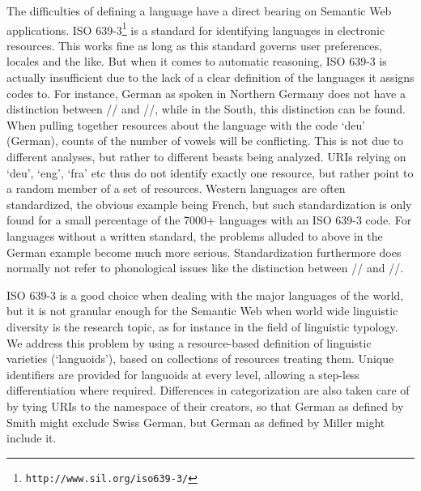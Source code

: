 \documentclass{llncs}
\begin{document}
The difficulties of defining a language have a direct bearing on Semantic Web applications. ISO 639-3\footnote{\texttt{http://www.sil.org/iso639-3/}} is a standard for identifying languages in electronic resources. This works fine as long as this standard governs user preferences, locales and the like. But when it comes to automatic reasoning, ISO 639-3 is actually insufficient due to the lack of a clear definition of the languages it assigns codes to. For instance, German as spoken in Northern Germany does not have a distinction between // and /\textipa{\ae:}/, while in the South, this distinction can be found. When pulling together resources about the language with the code `deu' (German), counts of the number of vowels will be conflicting. This is not due to different analyses, but rather to different beasts being analyzed. URIs relying on `deu', `eng', `fra' etc thus do not identify exactly one resource, but rather point to a random member of a set of resources. Western languages are often standardized, the obvious example being French, but such standardization is only found for a small percentage of the 7000+ languages with an ISO 639-3 code. For languages without a written standard, the problems alluded to above in the German example become much more serious. Standardization furthermore does normally not refer to phonological issues like the distinction between  // and /\textipa{\ae:}/. 

ISO 639-3 is a good choice when dealing with the major languages of the world, but it is not granular enough for the Semantic Web when world wide linguistic diversity is the research topic, as for instance in the field of linguistic typology.
We address this problem by using a resource-based definition of linguistic varieties (`languoids'), based on collections of resources treating them. Unique identifiers are provided for languoids at every level, allowing a step-less differentiation where required. Differences in categorization are also taken care of by tying URIs to the namespace of their creators, so that German as defined by Smith might exclude Swiss German, but German as defined by Miller might include it.
\end{document}
